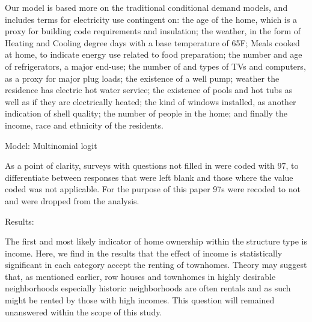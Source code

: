 \documentclass{article}
\begin{document}
Our model is based more on the traditional conditional demand models, and includes terms for electricity use contingent on: the age of the home, which is a proxy for building code requirements and insulation; the weather, in the form of Heating and Cooling degree days with a base temperature of 65F; Meals cooked at home, to indicate energy use related to food preparation; the number and age of refrigerators, a major end-use;  the number of and types of TVs and computers, as a proxy for major plug loads; the existence of a well pump; weather the residence has electric hot water service; the existence of pools and hot tubs as well as if they are electrically heated; the kind of windows installed, as another indication of shell quality; the number of people in the home; and finally the income, race and ethnicity of the residents.  


Model: Multinomial logit

As a point of clarity, surveys with questions not filled in were coded with 97, to differentiate between responses that were left blank and those where the value coded was not applicable.  For the purpose of this paper 97s were recoded to not and were dropped from the analysis.  


Results:

The first and most likely indicator of home ownership within the structure type is income.  Here, we find in the results that the effect of income is statistically significant in each category accept the renting of townhomes.  Theory may suggest that, as mentioned earlier, row houses and townhomes in highly desirable neighborhoods especially historic neighborhoods are often rentals and as such might be rented by those with high incomes.  This question will remained unanswered within the scope of this study. 
\end{document}
